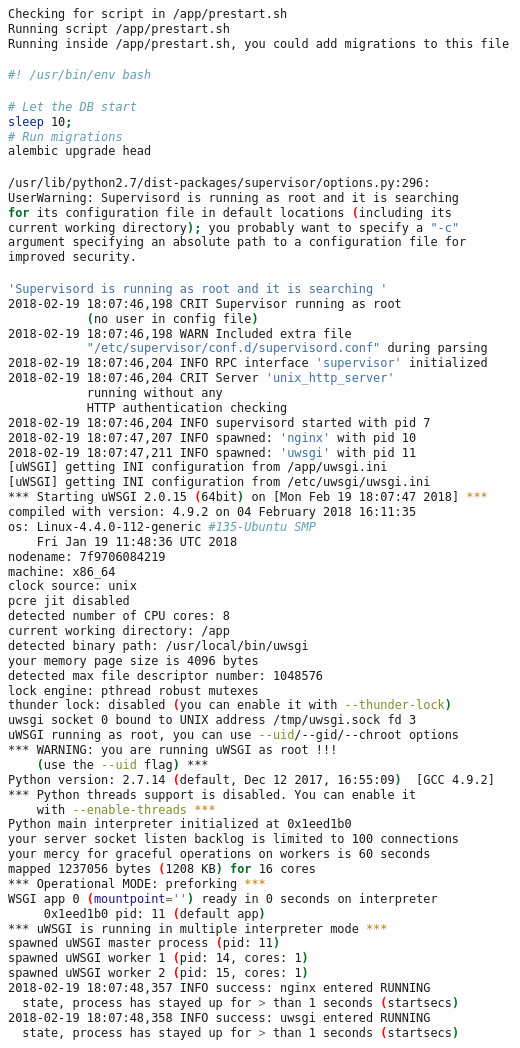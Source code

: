 \begin{lstlisting}[language=bash]
Checking for script in /app/prestart.sh
Running script /app/prestart.sh
Running inside /app/prestart.sh, you could add migrations to this file, e.g.:

#! /usr/bin/env bash

# Let the DB start
sleep 10;
# Run migrations
alembic upgrade head

/usr/lib/python2.7/dist-packages/supervisor/options.py:296:
UserWarning: Supervisord is running as root and it is searching
for its configuration file in default locations (including its
current working directory); you probably want to specify a "-c"
argument specifying an absolute path to a configuration file for
improved security.

'Supervisord is running as root and it is searching '
2018-02-19 18:07:46,198 CRIT Supervisor running as root 
           (no user in config file)
2018-02-19 18:07:46,198 WARN Included extra file
           "/etc/supervisor/conf.d/supervisord.conf" during parsing
2018-02-19 18:07:46,204 INFO RPC interface 'supervisor' initialized
2018-02-19 18:07:46,204 CRIT Server 'unix_http_server' 
           running without any
           HTTP authentication checking
2018-02-19 18:07:46,204 INFO supervisord started with pid 7
2018-02-19 18:07:47,207 INFO spawned: 'nginx' with pid 10
2018-02-19 18:07:47,211 INFO spawned: 'uwsgi' with pid 11
[uWSGI] getting INI configuration from /app/uwsgi.ini
[uWSGI] getting INI configuration from /etc/uwsgi/uwsgi.ini
*** Starting uWSGI 2.0.15 (64bit) on [Mon Feb 19 18:07:47 2018] ***
compiled with version: 4.9.2 on 04 February 2018 16:11:35
os: Linux-4.4.0-112-generic #135-Ubuntu SMP 
    Fri Jan 19 11:48:36 UTC 2018
nodename: 7f9706084219
machine: x86_64
clock source: unix
pcre jit disabled
detected number of CPU cores: 8
current working directory: /app
detected binary path: /usr/local/bin/uwsgi
your memory page size is 4096 bytes
detected max file descriptor number: 1048576
lock engine: pthread robust mutexes
thunder lock: disabled (you can enable it with --thunder-lock)
uwsgi socket 0 bound to UNIX address /tmp/uwsgi.sock fd 3
uWSGI running as root, you can use --uid/--gid/--chroot options
*** WARNING: you are running uWSGI as root !!! 
    (use the --uid flag) *** 
Python version: 2.7.14 (default, Dec 12 2017, 16:55:09)  [GCC 4.9.2]
*** Python threads support is disabled. You can enable it 
    with --enable-threads ***
Python main interpreter initialized at 0x1eed1b0
your server socket listen backlog is limited to 100 connections
your mercy for graceful operations on workers is 60 seconds
mapped 1237056 bytes (1208 KB) for 16 cores
*** Operational MODE: preforking ***
WSGI app 0 (mountpoint='') ready in 0 seconds on interpreter 
     0x1eed1b0 pid: 11 (default app)
*** uWSGI is running in multiple interpreter mode ***
spawned uWSGI master process (pid: 11)
spawned uWSGI worker 1 (pid: 14, cores: 1)
spawned uWSGI worker 2 (pid: 15, cores: 1)
2018-02-19 18:07:48,357 INFO success: nginx entered RUNNING 
  state, process has stayed up for > than 1 seconds (startsecs)
2018-02-19 18:07:48,358 INFO success: uwsgi entered RUNNING 
  state, process has stayed up for > than 1 seconds (startsecs)

\end{lstlisting}
